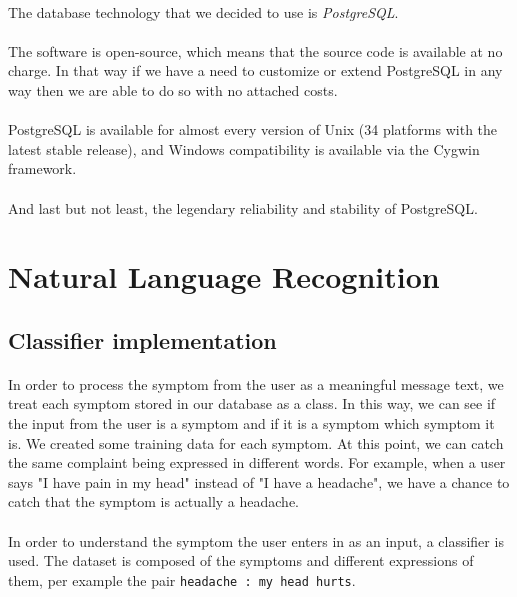 \paragraph{}
The database technology that we decided to use is \textit{PostgreSQL}\cite{bib:misc:1}.
\paragraph{}
The software is open-source, which means that the source code is available at no charge. In that way if we have a need to customize or extend PostgreSQL in any way then we are able to do so with no attached costs.
\paragraph{}
PostgreSQL is available for almost every version of Unix (34 platforms with the latest stable release), and Windows compatibility is available via the Cygwin framework.
\paragraph{}
And last but not least, the legendary reliability and stability of PostgreSQL.

\section{Natural Language Recognition}

\subsection{Classifier implementation}

\paragraph{}
In	order	to	process	the	symptom	from	the	user	as	a	meaningful	message	text,	we	treat	each	symptom	stored	in	our	database	as	a	class.	In	this	way,	we	can	see	if	the	input	from	the	user	is	a	symptom	and	if	it	is	a	symptom	which	symptom	it	is.	We	created	some	training	data	for	each	symptom.	At	this	point,	we	can	catch	the	same	complaint	being	expressed	in	different	words.	For	example,	when	a	user	says	"I	have	pain	in	my	head"	instead	of	"I	have	a	headache",	we	have	a	chance	to	catch	that	the	symptom	is	actually	a	headache.	

\paragraph{}
In order to understand the symptom the user enters in as an input, a classifier is used. The dataset is composed of the symptoms and different expressions of them, per example the pair \texttt{headache : my head hurts}.

